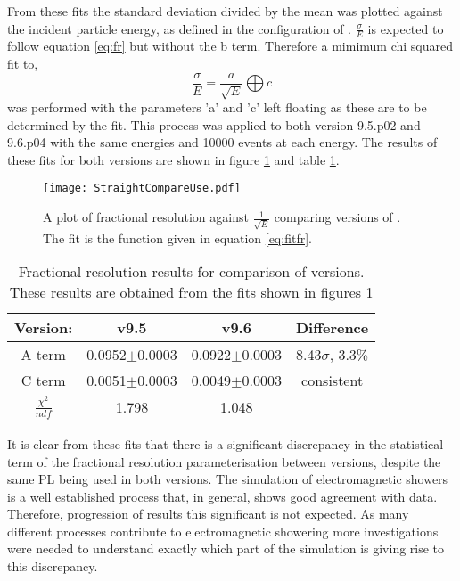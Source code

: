From these fits the standard deviation divided by the mean was plotted against the incident particle energy, as defined in the configuration of \geant.  $\frac{\sigma}{E}$ is expected to follow equation \ref{eq:fr} but without the b term. Therefore a mimimum chi squared fit to,
\begin{equation}
  \label{eq:fitfr}
  \frac{\sigma}{E}=\frac{a}{\sqrt{E}}\bigoplus c
\end{equation}
was performed with the parameters 'a' and 'c' left floating as these are to be determined by the fit.  This process was applied to both \geant version 9.5.p02 and 9.6.p04 with the same energies and 10000 events at each energy.  The results of these fits for both \geant versions are shown in figure \ref{fig:straightres} and table \ref{tab:results}.
\begin{figure}[h]
  \centering
  \texttt{[image: StraightCompareUse.pdf]}
  \caption{A plot of fractional resolution against $\frac{1}{\sqrt{E}}$ comparing versions of \geant. The fit is the function given in equation \ref{eq:fitfr}.}
  \label{fig:straightres}
\end{figure}

\begin{table}[h]
  \centering
  \begin{tabular}{|c|c|c|c|}
      \hline
      Version: & v9.5 & v9.6 & Difference  \\ \hline
      A term    & 0.0952$\pm$0.0003 & 0.0922$\pm$0.0003  & 8.43$\sigma$, 3.3\% \\ \hline
      C term    & 0.0051$\pm$0.0003 & 0.0049$\pm$0.0003 & consistent \\ \hline
      $\frac{\chi^2}{ndf}$   &1.798  & 1.048 &  \\ \hline
  \end{tabular}
  \caption{Fractional resolution results for comparison of \geant versions.  These results are obtained from the fits shown in figures \ref{fig:straightres}}
  \label{tab:results}
\end{table}

It is clear from these fits that there is a significant discrepancy in the statistical term of the fractional resolution parameterisation between \geant versions, despite the same PL being used in both versions.  The simulation of electromagnetic showers is a well established process that, in general, shows good agreement with data.  Therefore, progression of results this significant is not expected.  As many different processes contribute to electromagnetic showering more investigations were needed to understand exactly which part of the simulation is giving rise to this discrepancy.

